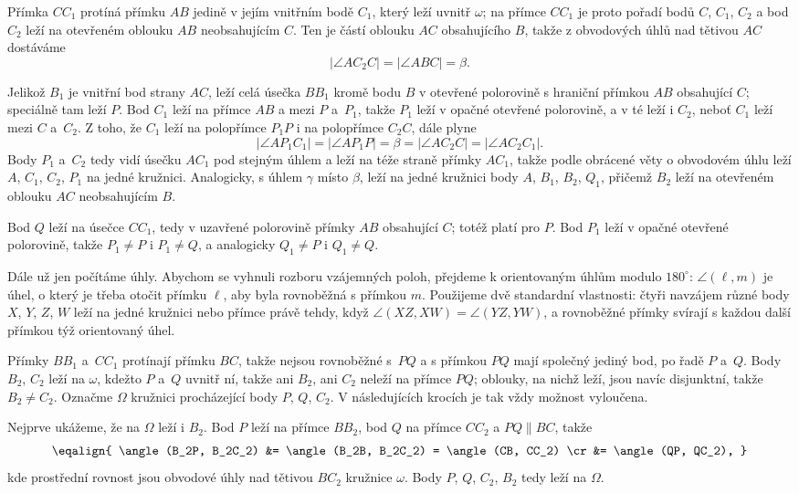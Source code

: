{    Přímka $CC_1$ protíná přímku $AB$ jedině v jejím vnitřním bodě $C_1$, který leží uvnitř $\omega$; na přímce $CC_1$ je proto pořadí bodů $C$, $C_1$, $C_2$ a bod $C_2$ leží na otevřeném oblouku $AB$ neobsahujícím $C$. Ten je částí oblouku $AC$ obsahujícího $B$, takže z obvodových úhlů nad tětivou $AC$ dostáváme
    $$
    |\angle AC_2C| = |\angle ABC| = \beta.
    $$

    Jelikož $B_1$ je vnitřní bod strany $AC$, leží celá úsečka $BB_1$ kromě bodu $B$ v otevřené polorovině s hraniční přímkou $AB$ obsahující $C$; speciálně tam leží $P$. Bod $C_1$ leží na přímce $AB$ a mezi $P$ a~$P_1$, takže $P_1$ leží v opačné otevřené polorovině, a v té leží i $C_2$, neboť $C_1$ leží mezi $C$ a~$C_2$. Z toho, že $C_1$ leží na polopřímce $P_1P$ i na polopřímce $C_2C$, dále plyne
    $$
    |\angle AP_1C_1| = |\angle AP_1P| = \beta = |\angle AC_2C| = |\angle AC_2C_1|.
    $$
    Body $P_1$ a~$C_2$ tedy vidí úsečku $AC_1$ pod stejným úhlem a leží na téže straně přímky $AC_1$, takže podle obrácené věty o obvodovém úhlu leží $A$, $C_1$, $C_2$, $P_1$ na jedné kružnici. Analogicky, s úhlem $\gamma$ místo $\beta$, leží na jedné kružnici body $A$, $B_1$, $B_2$, $Q_1$, přičemž $B_2$ leží na otevřeném oblouku $AC$ neobsahujícím $B$.

    Bod $Q$ leží na úsečce $CC_1$, tedy v uzavřené polorovině přímky $AB$ obsahující $C$; totéž platí pro $P$. Bod $P_1$ leží v opačné otevřené polorovině, takže $P_1 \neq P$ i $P_1 \neq Q$, a analogicky $Q_1 \neq P$ i $Q_1 \neq Q$.

    Dále už jen počítáme úhly. Abychom se vyhnuli rozboru vzájemných poloh, přejdeme k orientovaným úhlům modulo $180^\circ$: $\angle(\ell,m)$ je úhel, o který je třeba otočit přímku $\ell$, aby byla rovnoběžná s přímkou $m$. Použijeme dvě standardní vlastnosti: čtyři navzájem různé body $X$, $Y$, $Z$, $W$ leží na jedné kružnici nebo přímce právě tehdy, když $\angle(XZ,XW) = \angle(YZ,YW)$, a rovnoběžné přímky svírají s každou další přímkou týž orientovaný úhel.

    Přímky $BB_1$ a~$CC_1$ protínají přímku $BC$, takže nejsou rovnoběžné s~$PQ$ a s přímkou $PQ$ mají společný jediný bod, po řadě $P$ a~$Q$. Body $B_2$, $C_2$ leží na $\omega$, kdežto $P$ a~$Q$ uvnitř ní, takže ani $B_2$, ani $C_2$ neleží na přímce $PQ$; oblouky, na nichž leží, jsou navíc disjunktní, takže $B_2 \neq C_2$. Označme $\Omega$ kružnici procházející body $P$, $Q$, $C_2$. V následujících krocích je tak vždy možnost  vyloučena.

    Nejprve ukážeme, že na $\Omega$ leží i $B_2$. Bod $P$ leží na přímce $BB_2$, bod $Q$ na přímce $CC_2$ a $PQ \parallel BC$, takže
    $$
    \eqalign{
        \angle(B_2P, B_2C_2) &= \angle(B_2B, B_2C_2) = \angle(CB, CC_2) \cr
        &= \angle(QP, QC_2),
    }
    $$
    kde prostřední rovnost jsou obvodové úhly nad tětivou $BC_2$ kružnice $\omega$. Body $P$, $Q$, $C_2$, $B_2$ tedy leží na $\Omega$.

}
